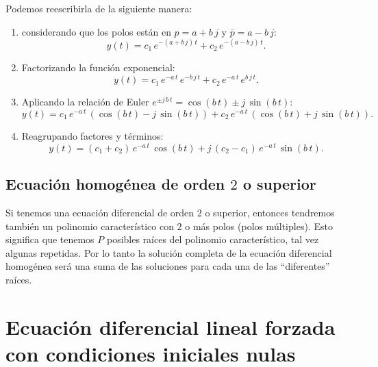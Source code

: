 \documentclass[11pt,a4paper,openany]{book}
\begin{document}
Podemos reescribirla de la siguiente manera:
\begin{enumerate}
	\item considerando que los polos están en $p = a + b \, j$ y $\overline{p} = a - b \, j$:
	\begin{equation}
		y(t) = c_{1} \, e^{-(a + b \, j) \, t} + c_{2} \, e^{-(a - b \, j) \, t}.
	\end{equation}
	\item Factorizando la función exponencial:
	\begin{equation}
		y(t) = c_{1} \, e^{-a \, t} \, e^{-b \, j \, t} + c_{2} \, e^{-a \, t} \, e^{b \, j \, t}.
	\end{equation}
	\item Aplicando la relación de Euler $e^{\pm j \, b \, t} = \cos(b \, t) \pm j \, \sin(b \, t)$:
	\begin{equation}
		y(t) = c_{1} \, e^{-a \, t} \, (\cos(b \, t) - j \, \sin(b \, t)) + 
		c_{2} \, e^{-a \, t} \, (\cos(b \, t) + j \, \sin(b \, t)).
	\end{equation}
	\item Reagrupando factores y términos:
	\begin{equation}
		y(t) = (c_{1} + c_{2}) \, e^{-a \, t} \, \cos(b \, t) + j \, (c_{2} - c_{1}) \, e^{-a \, t} \, \sin(b \, t).
	\end{equation}
\end{enumerate}

\subsection{Ecuación homogénea de orden $2$ o superior}

Si tenemos una ecuación diferencial de orden $2$ o superior, entonces tendremos también un polinomio característico con $2$ o más polos (polos múltiples). Esto significa que tenemos $P$ posibles raíces del polinomio característico, tal vez algunas repetidas. Por lo tanto la solución completa de la ecuación diferencial homogénea será una suma de las soluciones para cada una de las ``diferentes'' raíces.

\section{Ecuaci\'{o}n diferencial lineal forzada con condiciones iniciales nulas}
\end{document}
